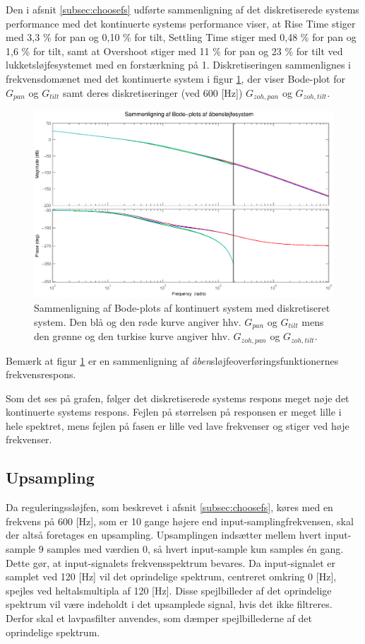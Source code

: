 Den i afsnit \ref{subsec:choosefs} udførte sammenligning af det diskretiserede systems performance
med det kontinuerte systems performance viser,
at Rise Time stiger med 3,3 \% for pan og 0,10 \% for tilt,
Settling Time stiger med 0,48 \% for pan og 1,6 \% for tilt,
samt at Overshoot stiger med 11 \% for pan og 23 \% for tilt
ved lukketsløjfesystemet med en forstærkning på 1.
Diskretiseringen sammenlignes i frekvensdomænet med det kontinuerte system
i figur \ref{fig:diskretBode}, der viser Bode-plot for \(G_{pan}\) og \(G_{tilt}\) samt
deres diskretiseringer (ved 600 [Hz]) \(G_{zoh,pan}\) og \(G_{zoh,tilt}\).
\begin{figure}[!th]
\centering
	\includegraphics[width=1\textwidth]{./graphics/diskretBode.eps}
\caption[Sammenligning af Bode-plots af kontinuert system med diskretiseret system]
{Sammenligning af Bode-plots af kontinuert system med diskretiseret system.
Den blå og den røde kurve angiver hhv. \(G_{pan}\) og \(G_{tilt}\) mens
den grønne og den turkise kurve angiver hhv. \(G_{zoh,pan}\) og \(G_{zoh,tilt}\).
}
\label{fig:diskretBode}
\end{figure}
Bemærk at figur \ref{fig:diskretBode} er en sammenligning af \textit{åben}sløjfeoverføringsfunktionernes
frekvensrespons.

Som det ses på grafen, følger det diskretiserede systems respons meget nøje det kontinuerte systems respons.
Fejlen på størrelsen på responsen er meget lille i hele spektret,
mens fejlen på fasen er lille ved lave frekvenser og stiger ved høje frekvenser.

\subsection{Upsampling}
Da reguleringssløjfen, som beskrevet i afsnit \ref{subsec:choosefs}, køres med en frekvens på 600 [Hz],
som er 10 gange højere end input-samplingfrekvensen, skal der altså foretages en upsampling.
Upsamplingen indsætter mellem hvert input-sample 9 samples med værdien 0, så hvert input-sample
kun samples én gang. Dette gør, at input-signalets frekvensspektrum bevares.
Da input-signalet er samplet ved 120 [Hz] vil det oprindelige spektrum, centreret omkring 0 [Hz],
spejles ved heltalsmultipla af 120 [Hz]. Disse spejlbilleder af det oprindelige spektrum vil være
indeholdt i det upsamplede signal, hvis det ikke filtreres. Derfor skal et lavpasfilter anvendes,
som dæmper spejlbillederne af det oprindelige spektrum.

